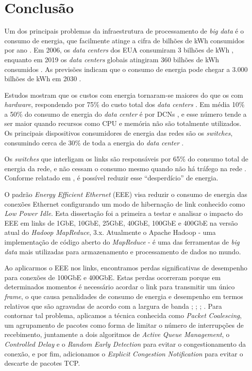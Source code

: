 \chapter{Conclusão}

Um dos principais problemas da infraestrutura de processamento de \emph{big data} é o consumo de energia, que facilmente atinge a cifra de bilhões de kWh consumidos por ano \cite{raizada2020worldwide}. Em 2006, os \emph{data centers} dos EUA consumiram 3 bilhões de kWh \cite{mahadevan2011energy}, enquanto em 2019 os \emph{data centers} globais atingiram 360 bilhões de kWh consumidos \cite{raizada2020worldwide}. As previsões indicam que o consumo de energia pode chegar a 3.000 bilhões de kWh em 2030 \cite{raizada2020worldwide}.

Estudos mostram que os custos com energia tornaram-se maiores do que os com \emph{hardware}, respondendo por 75\% do custo total dos \emph{data centers} \cite{belady2007data}. Em média 10\% a 50\% do consumo de energia do \emph{data center} é por DCNs \cite{abts2010energy}, e esse número tende a ser maior quando recursos como CPU e memória não são totalmente utilizados. Os principais dispositivos consumidores de energia das redes são os \emph{switches}, consumindo cerca de 30\% de toda a energia do \emph{data center} \cite{kliazovich2012greencloud}.

Os \emph{switches} que interligam os links são responsáveis por 65\% do consumo total de energia da rede, e não cessam o consumo mesmo quando não há tráfego na rede \cite{kliazovich2012greencloud}. Conforme relatado em \cite{mahadevan2009energy}, é possível reduzir esse “desperdício” de energia.

O padrão \emph{Energy Efficient Ethernet} (EEE) visa reduzir o consumo de energia das conexões Ethernet configurando um modo de hibernação de link conhecido como \emph{Low Power Idle}. Esta dissertação foi a primeira a testar e analisar o impacto do EEE em links de 1GbE, 10GbE, 25GbE, 40GbE, 100GbE e 400GbE na versão atual do \emph{Hadoop MapReduce}, 3.x. Atualmente o Apache Hadoop \cite{ApacheDocumentation} - uma implementação de código aberto do \emph{MapReduce} \cite{dean2004mapreduce} - é uma das ferramentas de \emph{big data} mais utilizadas para armazenamento e processamento de dados no mundo.

Ao aplicarmos o EEE nos links, encontramos perdas significativas de desempenho para conexões de 100GbE e 400GbE. Estas perdas ocorreram porque em determinados momentos é necessário acordar o link para transmitir um único \emph{frame}, o que causa penalidades de consumo de energia e desempenho em termos relativos que são agravadas de acordo com a largura de banda \cite{jiang2021modeling}; \cite{reviriego2009performance}; \cite{reviriego2010burst}; \cite{e2017energy}. Para contornar tal problema, aplicamos a técnica conhecida como \emph{Packet Coalescing}, um agrupamento de pacotes como forma de limitar o número de interrupções de recebimento, juntamente a dois algoritmos de \emph{Active Queue Management}, o \emph{Controlled Delay} e o \emph{Random Early Detection} para evitar o congestionamento da conexão, e por fim, adicionamos o \emph{Explicit Congestion Notification} para evitar o descarte de pacotes TCP.

